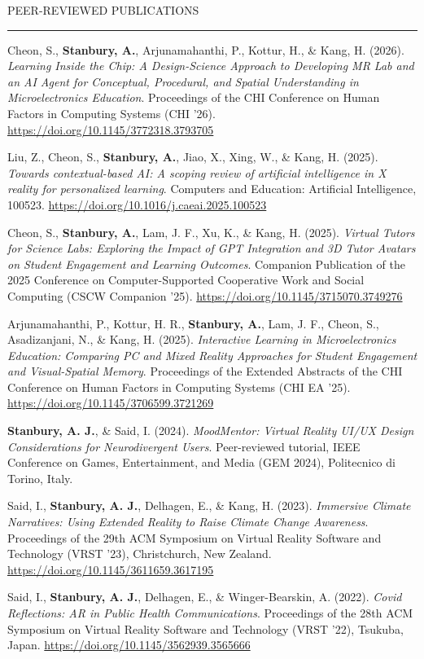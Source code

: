 \documentclass{resume} %
\renewenvironment{rSection}[1]{
  \needspace{4\baselineskip}
  \sectionskip
  \textcolor{CustomRed}{\MakeUppercase{#1}}
  \sectionlineskip
  \hrule
  \begin{list}{}{
    \setlength{\leftmargin}{1.5em}
  }
  \item[]
}{
  \end{list}
}
\begin{document}
\begin{rSection}{Peer-Reviewed Publications}
Cheon, S., \textbf{Stanbury, A.}, Arjunamahanthi, P., Kottur, H., \& Kang, H. (2026). \textit{Learning Inside the Chip: A Design-Science Approach to Developing MR Lab and an AI Agent for Conceptual, Procedural, and Spatial Understanding in Microelectronics Education}. Proceedings of the CHI Conference on Human Factors in Computing Systems (CHI '26). \url{https://doi.org/10.1145/3772318.3793705}

Liu, Z., Cheon, S., \textbf{Stanbury, A.}, Jiao, X., Xing, W., \& Kang, H. (2025). \textit{Towards contextual-based AI: A scoping review of artificial intelligence in X reality for personalized learning}. Computers and Education: Artificial Intelligence, 100523. \url{https://doi.org/10.1016/j.caeai.2025.100523}

Cheon, S., \textbf{Stanbury, A.}, Lam, J. F., Xu, K., \& Kang, H. (2025). \textit{Virtual Tutors for Science Labs: Exploring the Impact of GPT Integration and 3D Tutor Avatars on Student Engagement and Learning Outcomes}. Companion Publication of the 2025 Conference on Computer-Supported Cooperative Work and Social Computing (CSCW Companion '25). \url{https://doi.org/10.1145/3715070.3749276}

Arjunamahanthi, P., Kottur, H. R., \textbf{Stanbury, A.}, Lam, J. F., Cheon, S., Asadizanjani, N., \& Kang, H. (2025). \textit{Interactive Learning in Microelectronics Education: Comparing PC and Mixed Reality Approaches for Student Engagement and Visual-Spatial Memory}. Proceedings of the Extended Abstracts of the CHI Conference on Human Factors in Computing Systems (CHI EA '25). \url{https://doi.org/10.1145/3706599.3721269}

\textbf{Stanbury, A. J.}, \& Said, I. (2024). \textit{MoodMentor: Virtual Reality UI/UX Design Considerations for Neurodivergent Users}. Peer-reviewed tutorial, IEEE Conference on Games, Entertainment, and Media (GEM 2024), Politecnico di Torino, Italy.

Said, I., \textbf{Stanbury, A. J.}, Delhagen, E., \& Kang, H. (2023). \textit{Immersive Climate Narratives: Using Extended Reality to Raise Climate Change Awareness}. Proceedings of the 29th ACM Symposium on Virtual Reality Software and Technology (VRST '23), Christchurch, New Zealand. \url{https://doi.org/10.1145/3611659.3617195}

Said, I., \textbf{Stanbury, A. J.}, Delhagen, E., \& Winger-Bearskin, A. (2022). \textit{Covid Reflections: AR in Public Health Communications}. Proceedings of the 28th ACM Symposium on Virtual Reality Software and Technology (VRST '22), Tsukuba, Japan. \url{https://doi.org/10.1145/3562939.3565666}


\end{rSection}
\end{document}
